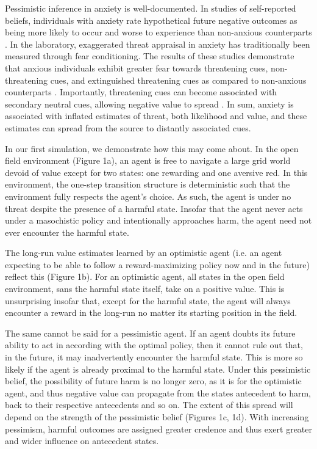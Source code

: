 \documentclass[11pt]{article} %
\begin{document}
Pessimistic inference in anxiety is well-documented. In studies of self-reported beliefs,
individuals with anxiety rate
hypothetical future negative outcomes as being more likely to occur and worse to
experience than non-anxious counterparts \citep{ButlerMathews1983, ButlerMathews1987,
Foa1996, MacLeod1996, MacLeod1997, Luten1997, Stober1997, Borkovec1999, Maner2006,
Mitte2007, Miranda2007}. In the laboratory, exaggerated threat appraisal in anxiety
has traditionally been measured through fear conditioning. The results of these
studies demonstrate that anxious individuals exhibit greater fear towards threatening
cues, non-threatening cues, and extinguished threatening cues as compared to non-anxious
counterparts \citep{lissek2005, MinekaOehlberg2008, Duits2015}. Importantly, threatening
cues can become associated with secondary neutral cues, allowing negative value to
spread \citep{wessa2007}. In sum, anxiety is associated with inflated estimates of
threat, both likelihood and value, and these estimates can spread from the source
to distantly associated cues.

In our first simulation, we demonstrate how this may come about. In the open field
environment (Figure 1a), an agent is free to navigate a large grid world devoid
of value except for two states: one rewarding and one aversive red. In this environment,
the one-step transition structure is deterministic such that the environment
fully respects the agent's choice. As such, the agent is under no threat despite
the presence of a harmful state. Insofar that the agent never acts under a
masochistic policy and intentionally approaches harm, the agent need not ever
encounter the harmful state.

The long-run value estimates learned by an optimistic agent (i.e. an agent expecting
to be able to follow a reward-maximizing policy now and in the future) reflect this
(Figure 1b). For an optimistic agent, all states in the open field environment,
sans the harmful state itself, take on a positive value. This is unsurprising
insofar that, except for the harmful state, the agent will always encounter
a reward in the long-run no matter its starting position in the field.

The same cannot be said for a pessimistic agent. If an agent doubts its future
ability to act in according with the optimal policy, then it cannot rule out that,
in the future, it may inadvertently encounter the harmful state. This is more so
likely if the agent is already proximal to the harmful state. Under this pessimistic
belief, the possibility of future harm is no longer zero, as it is for the optimistic
agent, and thus negative value can propagate from the states antecedent to harm,
back to their respective antecedents and so on. The extent of this spread will depend
on the strength of the pessimistic belief (Figures 1c, 1d). With increasing pessimism,
harmful outcomes are assigned greater credence and thus exert greater and wider
influence on antecedent states.
\end{document}
